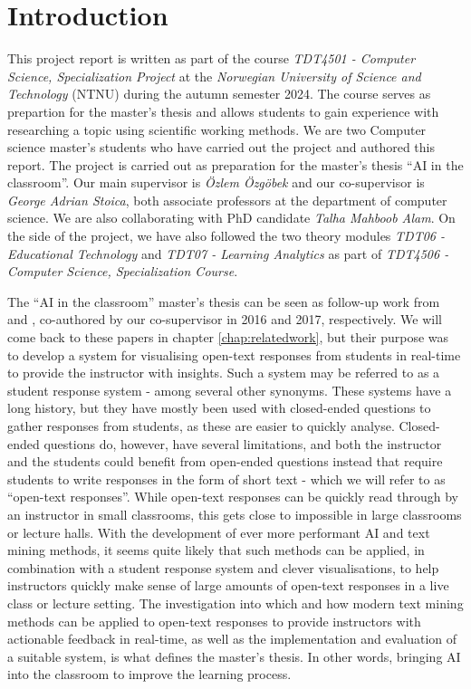 \chapter{Introduction}\label{sec:introduction}

This project report is written as part of the course \textit{TDT4501 - Computer Science, Specialization Project} at the \textit{Norwegian University of Science and Technology} (NTNU) during the autumn semester 2024. The course serves as prepartion for the master's thesis and allows students to gain experience with researching a topic using scientific working methods. We are two Computer science master's students who have carried out the project and authored this report. The project is carried out as preparation for the master's thesis ``AI in the classroom''. Our main supervisor is \textit{Özlem Özgöbek} and our co-supervisor is \textit{George Adrian Stoica}, both associate professors at the department of computer science. We are also collaborating with PhD candidate \textit{Talha Mahboob Alam}. On the side of the project, we have also followed the two theory modules \textit{TDT06 - Educational Technology} and \textit{TDT07 - Learning Analytics} as part of \textit{TDT4506 - Computer Science, Specialization Course}.

The ``AI in the classroom'' master's thesis can be seen as follow-up work from \cite{stoica2016} and \cite{stoica2017}, co-authored by our co-supervisor in 2016 and 2017, respectively. We will come back to these papers in chapter \ref{chap:relatedwork}, but their purpose was to develop a system for visualising open-text responses from students in real-time to provide the instructor with insights. Such a system may be referred to as a student response system - among several other synonyms. These systems have a long history, but they have mostly been used with closed-ended questions to gather responses from students, as these are easier to quickly analyse. Closed-ended questions do, however, have several limitations, and both the instructor and the students could benefit from open-ended questions instead that require students to write responses in the form of short text - which we will refer to as ``open-text responses''. While open-text responses can be quickly read through by an instructor in small classrooms, this gets close to impossible in large classrooms or lecture halls. With the development of ever more performant AI and text mining methods, it seems quite likely that such methods can be applied, in combination with a student response system and clever visualisations, to help instructors quickly make sense of large amounts of open-text responses in a live class or lecture setting. The investigation into which and how modern text mining methods can be applied to open-text responses to provide instructors with actionable feedback in real-time, as well as the implementation and evaluation of a suitable system, is what defines the master's thesis. In other words, bringing AI into the classroom to improve the learning process.

